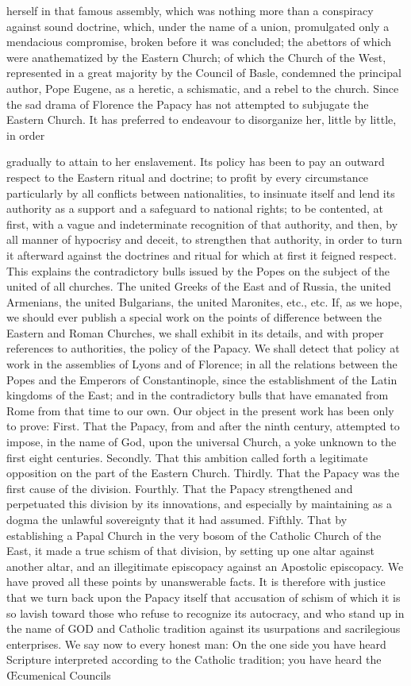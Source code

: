 herself in that famous assembly, which was nothing more than a conspiracy against sound doctrine, which, under the name of a union, promulgated only a mendacious compromise, broken before it was concluded; the abettors of which were anathematized by the Eastern Church; of which the Church of the West, represented in a great majority by the Council of Basle, condemned the principal author, Pope Eugene, as a heretic, a schismatic, and a rebel to the church. Since the sad drama of Florence the Papacy has not attempted to subjugate the Eastern Church. It has preferred to endeavour to disorganize her, little by little, in order

gradually to attain to her enslavement. Its policy has been to pay an outward respect to the Eastern ritual and doctrine; to profit by every circumstance particularly by all conflicts between nationalities, to insinuate itself and lend its authority as a support and a safeguard to national rights; to be contented, at first, with a vague and indeterminate recognition of that authority, and then, by all manner of hypocrisy and deceit, to strengthen that authority, in order to turn it afterward against the doctrines and ritual for which at first it feigned respect. This explains the contradictory bulls issued by the Popes on the subject of the united of all churches. The united Greeks of the East and of Russia, the united Armenians, the united Bulgarians, the united Maronites, etc., etc. If, as we hope, we should ever publish a special work on the points of difference between the Eastern and Roman Churches, we shall exhibit in its details, and with proper references to authorities, the policy of the Papacy. We shall detect that policy at work in the assemblies of Lyons and of Florence; in all the relations between the Popes and the Emperors of Constantinople, since the establishment of the Latin kingdoms of the East; and in the contradictory bulls that have emanated from Rome from that time to our own. Our object in the present work has been only to prove: First. That the Papacy, from and after the ninth century, attempted to impose, in the name of God, upon the universal Church, a yoke unknown to the first eight centuries. Secondly. That this ambition called forth a legitimate opposition on the part of the Eastern Church. Thirdly. That the Papacy was the first cause of the division. Fourthly. That the Papacy strengthened and perpetuated this division by its innovations, and especially by maintaining as a dogma the unlawful sovereignty that it had assumed. Fifthly. That by establishing a Papal Church in the very bosom of the Catholic Church of the East, it made a true schism of that division, by setting up one altar against another altar, and an illegitimate episcopacy against an Apostolic episcopacy. We have proved all these points by unanswerable facts. It is therefore with justice that we turn back upon the Papacy itself that accusation of schism of which it is so lavish toward those who refuse to recognize its autocracy, and who stand up in the name of GOD and Catholic tradition against its usurpations and sacrilegious enterprises. We say now to every honest man: On the one side you have heard Scripture interpreted according to the Catholic tradition; you have heard the Œcumenical Councils 